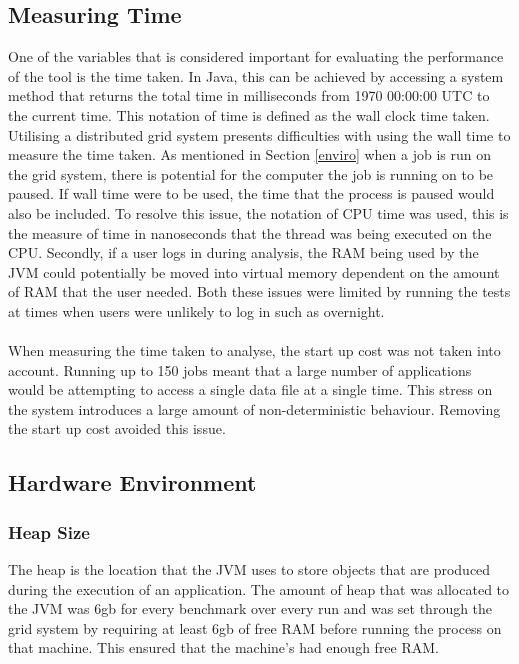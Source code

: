 \subsection{Measuring Time}
One of the variables that is considered important for evaluating the performance of the tool is the time taken. In Java, this can be achieved by accessing a system method that returns the total time in milliseconds from 1970 00:00:00 UTC to the current time. This notation of time is defined as the wall clock time taken. Utilising a distributed grid system presents difficulties with using the wall time to measure the time taken. As mentioned in Section \ref{enviro} when a job is run on the grid system, there is potential for the computer the job is running on to be paused. If wall time were to be used, the time that the process is paused would also be included. To resolve this issue, the notation of CPU time was used, this is the measure of time in nanoseconds that the thread was being executed on the CPU. Secondly, if a user logs in during analysis, the RAM being used by the JVM could potentially be moved into virtual memory dependent on the amount of RAM that the user needed. Both these issues were limited by running the tests at times when users were unlikely to log in such as overnight.
\paragraph{}
When measuring the time taken to analyse, the start up cost was not taken into account. Running up to 150 jobs meant that a large number of applications would be attempting to access a single data file at a single time. This stress on the system introduces a large amount of non-deterministic behaviour. Removing the start up cost avoided this issue.

\subsection{Hardware Environment}
\subsubsection{Heap Size}

The heap is the location that the JVM uses to store objects that are produced during the execution of an application. The amount of heap that was allocated to the JVM was 6gb for every benchmark over every run and was set through the grid system by requiring at least 6gb of free RAM before running the process on that machine. This ensured that the machine's had enough free RAM.

